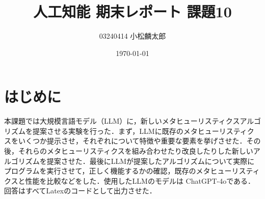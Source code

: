 \documentclass[a4paper]{ltjsarticle}
\title{人工知能 期末レポート 課題10}
\author{03240414  小松麟太郎}
\date{\today}
\begin{document}
\maketitle

\section{はじめに}
本課題では大規模言語モデル（LLM）に，新しいメタヒューリスティクスアルゴリズムを提案させる実験を行った．まず，LLMに既存のメタヒューリスティクスをいくつか提示させ，それぞれについて特徴や重要な要素を挙げさせた．その後，それらのメタヒューリスティクスを組み合わせたり改良したりした新しいアルゴリズムを提案させた．最後にLLMが提案したアルゴリズムについて実際にプログラムを実行させて，正しく機能するかの確認，既存のメタヒューリスティクスと性能を比較などをした．使用したLLMのモデルは ChatGPT-4oである．回答はすべてLatexのコードとして出力させた．
\end{document}
